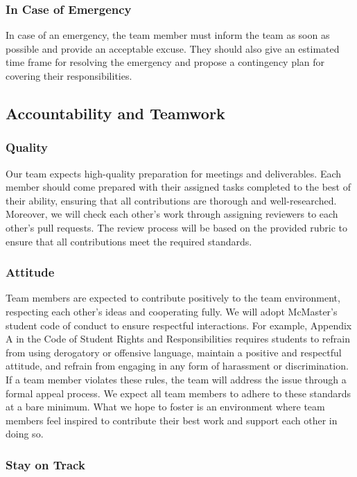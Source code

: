 \documentclass{article}
\begin{document}
\subsubsection*{In Case of Emergency}

In case of an emergency, the team member must inform the team as soon as possible and provide an acceptable excuse. They should also give an estimated time frame for resolving the emergency and propose a contingency plan for covering their responsibilities.

\subsection*{Accountability and Teamwork}

\subsubsection*{Quality}

Our team expects high-quality preparation for meetings and deliverables. Each member should come prepared with their assigned tasks completed to the best of their ability, ensuring that all contributions are thorough and well-researched. Moreover, we will check each other's work through assigning reviewers to each other's pull requests. The review process will be based on the provided rubric to ensure that all contributions meet the required standards.

\subsubsection*{Attitude}

Team members are expected to contribute positively to the team environment, respecting each other's ideas and cooperating fully. We will adopt McMaster's student code of conduct to ensure respectful interactions. For example, Appendix A in the Code of Student Rights and Responsibilities requires students to refrain from using derogatory or offensive language, maintain a positive and respectful attitude, and refrain from engaging in any form of harassment or discrimination. If a team member violates these rules, the team will address the issue through a formal appeal process. We expect all team members to adhere to these standards at a bare minimum. What we hope to foster is an environment where team members feel inspired to contribute their best work and support each other in doing so.

\subsubsection*{Stay on Track}
\end{document}
